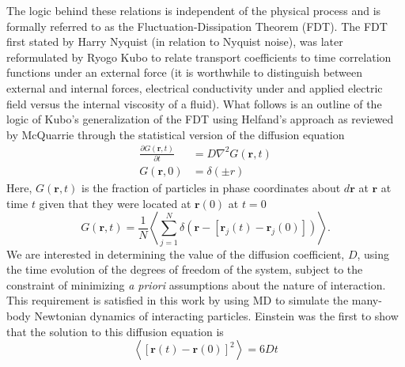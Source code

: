 The logic behind these relations is independent of the physical process and is formally referred to as the Fluctuation-Dissipation Theorem (FDT). The FDT first stated by Harry Nyquist (in relation to Nyquist noise), was later reformulated by Ryogo Kubo to relate transport coefficients to time correlation functions \cite{JPSJ.12.570} under an external force (it is worthwhile to distinguish between external and internal forces, electrical conductivity under and applied electric field versus the internal viscosity of a fluid)\cite{zwanzig1965time}. What follows is an outline of the logic of Kubo's generalization of the FDT using Helfand's approach as reviewed by McQuarrie \cite{mcquarrie2000statistical} through the statistical version of the diffusion equation
%
\begin{equation}
\begin{split}
	\frac{\partial G(\bm{r},t)}{\partial t}&= D \nabla ^2G(\bm{r},t)\\
G(\bm{r},0)&=\delta(\pm{r})
\end{split}
\end{equation}
%
Here, $G(\bm{r},t)$ is the fraction of particles in phase coordinates about $d\bm{r}$ at $\bm{r}$ at time $t$ given that they were located at $\bm{r}(0)$ at $t=0$
%
\begin{equation}
G(\bm{r},t)= \frac{1}{N}\left<\sum_{j=1}^N\delta(\bm{r}-[\bm{r}_j(t)-\bm{r}_j(0)])\right>.
\end{equation}
%
We are interested in determining the value of the diffusion coefficient, $D$, using the time evolution of the degrees of freedom of the system, subject to the constraint of minimizing \textit{a priori} assumptions about the nature of interaction. This requirement is satisfied in this work by using MD to simulate the many-body Newtonian dynamics of interacting particles. Einstein was the first to show that the solution to this diffusion equation is \cite{einstein1905brownian}
%
\begin{equation} \label{EQ:Einstein}
\left<[\bm{r}(t)-\bm{r}(0)]^2\right>=6Dt
\end{equation}
%
%
